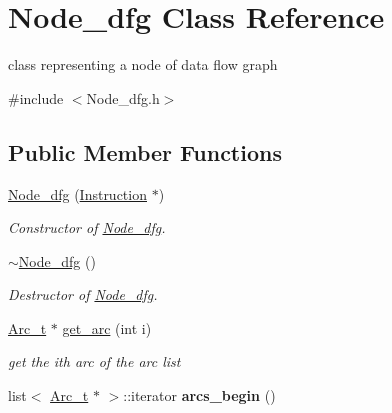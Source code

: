 \hypertarget{classNode__dfg}{\section{\-Node\-\_\-dfg \-Class \-Reference}
\label{classNode__dfg}
}


class representing a node of data flow graph  




{\ttfamily \#include $<$\-Node\-\_\-dfg.\-h$>$}

\subsection*{\-Public \-Member \-Functions}
\begin{DoxyCompactItemize}
\item 
\hypertarget{classNode__dfg_ac9b79961aaadf29eecd03b227b4c0875}{\hyperlink{classNode__dfg_ac9b79961aaadf29eecd03b227b4c0875}{\-Node\-\_\-dfg} (\hyperlink{classInstruction}{\-Instruction} $\ast$)}\label{classNode__dfg_ac9b79961aaadf29eecd03b227b4c0875}

\begin{DoxyCompactList}\small\item\em \-Constructor of \hyperlink{classNode__dfg}{\-Node\-\_\-dfg}. \end{DoxyCompactList}\item 
\hypertarget{classNode__dfg_a0a2a7c4634ad6802e7c69ab0d95957fa}{\hyperlink{classNode__dfg_a0a2a7c4634ad6802e7c69ab0d95957fa}{$\sim$\-Node\-\_\-dfg} ()}\label{classNode__dfg_a0a2a7c4634ad6802e7c69ab0d95957fa}

\begin{DoxyCompactList}\small\item\em \-Destructor of \hyperlink{classNode__dfg}{\-Node\-\_\-dfg}. \end{DoxyCompactList}\item 
\hypertarget{classNode__dfg_adc4a8e37604e57eec03fecaaca094fb5}{\hyperlink{structArc__t}{\-Arc\-\_\-t} $\ast$ \hyperlink{classNode__dfg_adc4a8e37604e57eec03fecaaca094fb5}{get\-\_\-arc} (int i)}\label{classNode__dfg_adc4a8e37604e57eec03fecaaca094fb5}

\begin{DoxyCompactList}\small\item\em get the ith arc of the arc list \end{DoxyCompactList}\item 
\hypertarget{classNode__dfg_a6ebd568efb70f729f6e355cdd46a5185}{list$<$ \hyperlink{structArc__t}{\-Arc\-\_\-t} $\ast$ $>$\-::iterator {\bfseries arcs\-\_\-begin} ()}\label{classNode__dfg_a6ebd568efb70f729f6e355cdd46a5185}


\end{DoxyCompactItemize}
